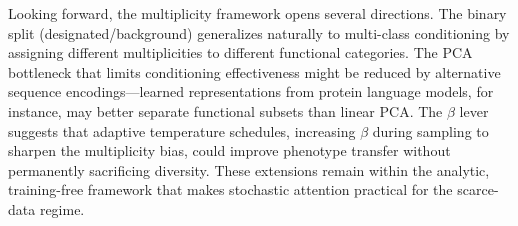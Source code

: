 Looking forward, the multiplicity framework opens several directions. The binary split
(designated/background) generalizes naturally to multi-class conditioning by assigning different
multiplicities to different functional categories. The PCA bottleneck that limits conditioning
effectiveness might be reduced by alternative sequence encodings---learned representations from
protein language models, for instance, may better separate functional subsets than linear PCA.
The $\beta$ lever suggests that adaptive temperature schedules, increasing $\beta$ during sampling
to sharpen the multiplicity bias, could improve phenotype transfer without permanently sacrificing
diversity. These extensions remain within the analytic, training-free framework that makes
stochastic attention practical for the scarce-data regime.
